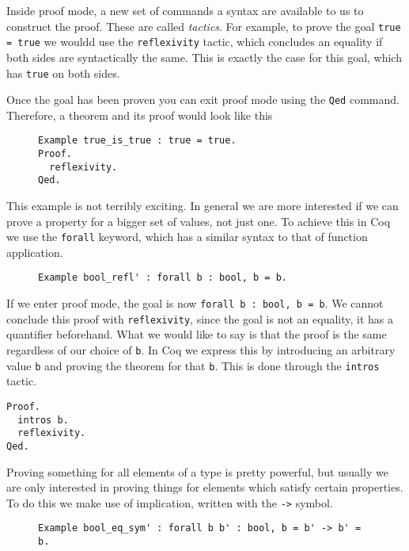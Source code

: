 Inside proof mode, a new set of commands a syntax are available to us to construct the proof. These are
called \emph{tactics}. For example, to prove the goal \texttt{true = true} we wouldd use the 
\texttt{reflexivity} tactic, which concludes an equality if both sides are syntactically the same. This is
exactly the case for this goal, which has \texttt{true} on both sides.

Once the goal has been proven you can exit proof mode using the \texttt{Qed} command. Therefore,
a theorem and its proof would look like this

\begin{figure}[!ht]
\begin{verbatim}
Example true_is_true : true = true.
Proof.
  reflexivity.
Qed.
\end{verbatim}
\label{lst:true-is-true}
\end{figure}

This example is not terribly exciting. In general we are more interested if we can prove a property for a
bigger set of values, not just one. To achieve this in Coq we use the \texttt{forall} 
keyword, which has a similar syntax to that of function application.

\begin{figure}[!ht]
\begin{verbatim}
Example bool_refl' : forall b : bool, b = b.
\end{verbatim}
\label{lst:bool-eq-refl}
\end{figure}

If we enter proof mode, the goal is now \texttt{forall b : bool, b = b}. We cannot conclude this
proof with \texttt{reflexivity}, since the goal is not an equality, it has a quantifier 
beforehand. What we would like to say is that the proof is the same regardless of our choice of 
\texttt{b}. In Coq we express this by introducing an arbitrary value \texttt{b} and
proving the theorem for that \texttt{b}. This is done through the \texttt{intros} 
tactic.

\begin{verbatim}
Proof.
  intros b.
  reflexivity.
Qed.
\end{verbatim}

Proving something for all elements of a type is pretty powerful, but usually we are only interested in
proving things for elements which satisfy certain properties. To do this we make use of implication,
written with the \texttt{->} symbol.
\begin{figure}[!ht]
\begin{verbatim}
Example bool_eq_sym' : forall b b' : bool, b = b' -> b' = b.
\end{verbatim}
\label{lst:bool-eq-sym}
\end{figure}

